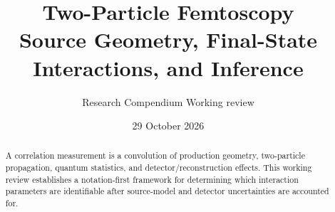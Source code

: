 \documentclass[11pt]{article}
\title{\bfseries Two-Particle Femtoscopy\\[3pt]\large Source Geometry, Final-State Interactions, and Inference}
\author{Research Compendium \;\textbar\; Working review}
\date{29 October 2026}
\begin{document}
\maketitle
{}
\begin{abstract}
A correlation measurement is a convolution of production geometry, two-particle propagation, quantum statistics, and detector/reconstruction effects. This working review establishes a notation-first framework for determining which interaction parameters are identifiable after source-model and detector uncertainties are accounted for.
\end{abstract}
\tableofcontents
\clearpage


\printbibliography[heading=bibintoc,title={References}]
\end{document}
